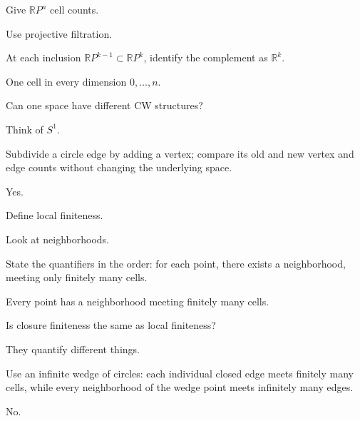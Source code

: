 \begin{exercise}\label{exr:viii06-15}
Give \(\mathbb RP^n\) cell counts.
\end{exercise}
\begin{hint}
Use projective filtration.

At each inclusion \(\mathbb RP^{k-1}\subset\mathbb RP^k\), identify the complement as \(\mathbb R^k\).
\end{hint}
\begin{solution}
One cell in every dimension \(0,\dots,n\).
\end{solution}

\begin{exercise}\label{exr:viii06-16}
Can one space have different CW structures?
\end{exercise}
\begin{hint}
Think of \(S^1\).

Subdivide a circle edge by adding a vertex; compare its old and new vertex and edge counts without changing the underlying space.
\end{hint}
\begin{solution}
Yes.
\end{solution}

\begin{exercise}\label{exr:viii06-17}
Define local finiteness.
\end{exercise}
\begin{hint}
Look at neighborhoods.

State the quantifiers in the order: for each point, there exists a neighborhood, meeting only finitely many cells.
\end{hint}
\begin{solution}
Every point has a neighborhood meeting finitely many cells.
\end{solution}

\begin{exercise}\label{exr:viii06-18}
Is closure finiteness the same as local finiteness?
\end{exercise}
\begin{hint}
They quantify different things.

Use an infinite wedge of circles: each individual closed edge meets finitely many cells, while every neighborhood of the wedge point meets infinitely many edges.
\end{hint}
\begin{solution}
No.
\end{solution}

